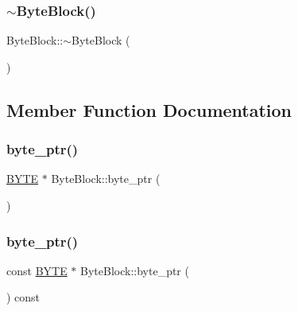 \mbox{\label{class_byte_block_ae34629ddad3e2185596f6fb346fb0dd8}} 
\subsubsection{\texorpdfstring{$\sim$\+Byte\+Block()}{~ByteBlock()}}
{\footnotesize\ttfamily Byte\+Block\+::$\sim$\+Byte\+Block (\begin{DoxyParamCaption}{ }\end{DoxyParamCaption})}



\subsection{Member Function Documentation}
\mbox{\label{class_byte_block_af61ceea6259a82189d1576f16931a9bf}} 
\subsubsection{\texorpdfstring{byte\+\_\+ptr()}{byte\_ptr()}\hspace{0.1cm}{\footnotesize\ttfamily [1/2]}}
{\footnotesize\ttfamily \hyperlink{mycrypto_8hpp_a4ae1dab0fb4b072a66584546209e7d58}{B\+Y\+TE} $\ast$ Byte\+Block\+::byte\+\_\+ptr (\begin{DoxyParamCaption}{ }\end{DoxyParamCaption})}

\mbox{\label{class_byte_block_ad1cca46563041dfa94469213e71eeab6}} 
\subsubsection{\texorpdfstring{byte\+\_\+ptr()}{byte\_ptr()}\hspace{0.1cm}{\footnotesize\ttfamily [2/2]}}
{\footnotesize\ttfamily const \hyperlink{mycrypto_8hpp_a4ae1dab0fb4b072a66584546209e7d58}{B\+Y\+TE} $\ast$ Byte\+Block\+::byte\+\_\+ptr (\begin{DoxyParamCaption}{ }\end{DoxyParamCaption}) const}

